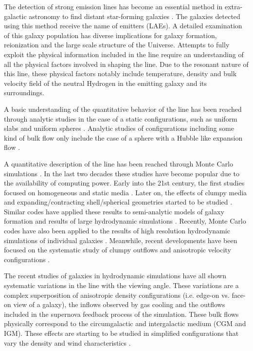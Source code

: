 \documentclass{emulateapj}
\newcommand{\ly}{{\ifmmode{{\rm Ly}\alpha~}\else{Ly$\alpha$~}\fi}}
\begin{document}
The detection of strong \ly emission lines has become an essential
method in extra-galactic astronomy to find distant star-forming
galaxies
\citep{PartridgePeebles,Rhoads00,Gawiser2007,Koehler2007,Ouchi08,Yamada2012,Schenker2012,Finkelstein2013}.
The galaxies detected using this method receive the 
name of \ly emitters (LAEs). A detailed examination of this galaxy
population has diverse implications for galaxy formation, reionization
and the large scale structure of the Universe. Attempts to fully
exploit the physical information included in the \ly line require an
understanding of all the physical factors involved in shaping the
line. Due to the resonant nature of this line, these physical factors
notably include temperature, density and bulk velocity field of the neutral
Hydrogen in the emitting galaxy and its surroundings.


A basic understanding of the quantitative behavior of the \ly line
has been reached through analytic studies in the case of a static
configurations, such as uniform slabs
\citep{Adams72,Harrington73,Neufeld90} and uniform spheres
\citep{Dijkstra06}. Analytic studies of configurations including
some kind of bulk flow only include the case of a sphere with a Hubble
like expansion flow \citep{LoebRybicki}. 

A quantitative description of the \ly line has been reached through
Monte Carlo simulations \citep{Auer68,Avery68,Adams72}. In the last
two decades these studies have become popular due to the
availability of computing power. Early into the 21st century, the first
studies focused on homogeneous and static media
\citep{Ahn00,Ahn01,Zheng02}. Later on, the effects of clumpy media
\citep{Hansen06} and expanding/contracting shell/spherical geometries started to
be studied \citep{Verhamme06,Dijkstra06,Ahn2014}. Similar codes have applied
these results to semi-analytic models of galaxy formation \citep{Orsi12, Garel2012} and
results of large hydrodynamic simulations
\citep{CLARA,Forero12,Behrens13}. Recently, Monte Carlo codes have also
been applied to the results of high resolution hydrodynamic
simulations of individual
galaxies \citep{Laursen09,Barnes11,Verhamme12,Yajima12}. Meanwhile, recent
developments have been focused on the systematic study of clumpy
outflows \citep{DijkstraKramer}and anisotropic velocity configurations
\citep{Zheng2013}. 

The recent studies of galaxies in hydrodynamic simulations
\citep{Laursen09,Barnes11,Verhamme12,Yajima12} have all shown
systematic variations in the \ly line with the viewing angle. These
variations are a complex superposition of anisotropic density
configurations (i.e. edge-on vs. face-on view of a galaxy), the
inflows observed by gas cooling and the outflows included in the
supernova feedback process of the simulation. These bulk flows
physically correspond to the circumgalactic and intergalactic medium
(CGM and IGM). These effects are starting to be studied
 in simplified configurations that vary the density and wind
 characteristics \citep{Zheng2013,Behrens2014}. 
\end{document}
